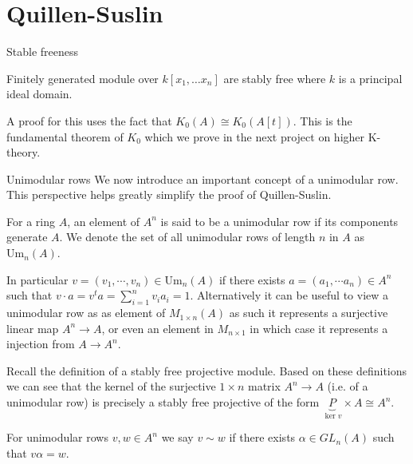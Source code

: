\documentclass{beamer}
\begin{document}
\section{Quillen-Suslin}
\begin{frame}{Stable freeness}
		\begin{theorem}
		Finitely generated module over $k[x_1,\dots x_n]$ are stably free where $k$ is a principal ideal domain.
	\end{theorem}
	A proof for this uses the fact that $K_0(A) \cong K_0(A[t])$. This is the fundamental theorem of $K_0$ which we prove in the next project on higher K-theory.
\end{frame}

\begin{frame}[allowframebreaks]{Unimodular rows}
		We now introduce an important concept of a unimodular row. This perspective helps greatly simplify the proof of Quillen-Suslin.
	
	\begin{definition}
		For a ring $A$, an element of $A^n$ is said to be a unimodular row if its components generate $A$. We denote the set of all unimodular rows of length $n$ in $A$ as $\mathrm{Um}_n(A)$.
	\end{definition}
	
	In particular $v=(v_1, \cdots, v_n) \in \mathrm{Um}_n(A) $ if there exists $a=(a_1, \cdots a_n) \in A^n$ such that $ v \cdot a = v^t a = \sum_{i=1}^n v_i a_i = 1$.
	Alternatively it can be useful to view a unimodular row as as element of $M_{1 \times n} (A) $ as such it represents a surjective linear map $A^n \to A$, or even an element in $M_{n \times 1}$ in which case it represents a injection from $A \to A^n$.
	
	Recall the definition of a stably free projective module. Based on these definitions we can see that the kernel of the surjective $1 \times n $ matrix $A^n \to A$ (i.e. of a unimodular row) is precisely a stably free projective of the form $\underbrace{P}_{\ker v} \times A \cong A^n$.
	
	
	
	\begin{definition}
		For unimodular rows $v,w\in A^n$ we say $v \sim w $ if there exists $ \alpha \in GL_n(A)$ such that $v\alpha =w$.
	\end{definition}
	

\end{frame}
\end{document}
